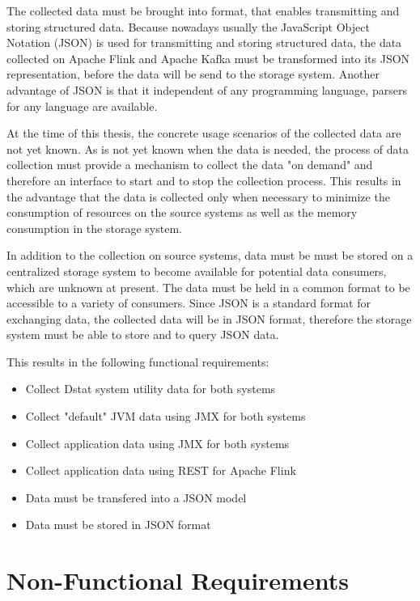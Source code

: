 The collected data must be brought into format, that enables transmitting and storing structured data.
Because nowadays usually the JavaScript Object Notation (JSON) is used for transmitting and storing
structured data, the data collected on Apache Flink and Apache Kafka must be transformed into its JSON
representation, before the data will be send to the storage system. Another advantage of JSON is
that it independent of any programming language, parsers for any language are available.

At the time of this thesis, the concrete usage scenarios of the collected data are not yet known.
As is not yet known when the data is needed, the process of data collection must provide a mechanism
to collect the data "on demand" and therefore an interface to start and to stop the collection process.
This results in the advantage that the data is collected only when necessary to minimize the consumption
of resources on the source systems as well as the memory consumption in the storage system.

In addition to the collection on source systems, data must be must be stored on a centralized storage system
to become available for potential data consumers, which are unknown at present. The data must be held in a
common format to be accessible to a variety of consumers. Since JSON is a standard format for exchanging data,
the collected data will be in JSON format, therefore the storage system must be able to store and to query
JSON data.

This results in the following functional requirements:

\begin{itemize}
	\item Collect Dstat system utility data for both systems
	\item Collect "default" JVM data using JMX for both systems
	\item Collect application data using JMX for both systems
	\item Collect application data using REST for Apache Flink
	\item Data must be transfered into a JSON model
	\item Data must be stored in JSON format
\end{itemize}

\section{Non-Functional Requirements}

